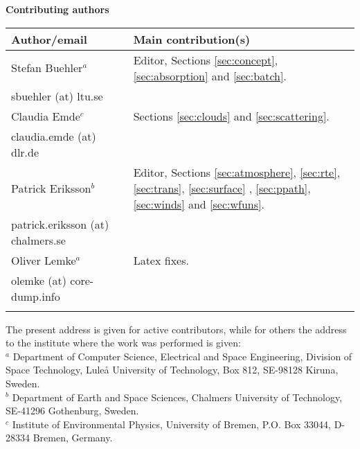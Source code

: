 \documentclass[11pt,twoside,a4paper,fleqn]{book}
\begin{document}
%
\newpage
\thispagestyle{plain}
%
\begin{center}
  {\Large \bf Contributing authors}
\end{center}
\vspace*{10mm}
\begin{tabular}{lp{10mm}l}
  \hline
  {\bf Author/email} & & {\bf Main contribution(s)} \\
  \hline
  Stefan Buehler$^a$ & & Editor, Sections \ref{sec:concept},
  \ref{sec:absorption} and \ref{sec:batch}.\\
  sbuehler (at) ltu.se & &        \\
 \hline
  Claudia Emde$^c$ & & Sections \ref{sec:clouds} and \ref{sec:scattering}.\\
  claudia.emde (at) dlr.de & & \\
  \hline
  Patrick Eriksson$^b$ &  & Editor, 
  Sections \ref{sec:atmosphere}, \ref{sec:rte}, \ref{sec:trans}, 
  \ref{sec:surface} , \ref{sec:ppath}, \ref{sec:winds} and \ref{sec:wfuns}.\\  
  patrick.eriksson (at) chalmers.se & & \\
  \hline
  Oliver Lemke$^a$ & & Latex fixes.\\
  olemke (at) core-dump.info & & \\
  \hline
 &&\\
\end{tabular}


\noindent
The present address is given for active contributors, while for others
the address to the institute where the work was performed is given:\\
$^a$ Department of Computer Science, Electrical and Space Engineering,
Division of Space Technology, Lule{\aa} University of Technology, Box
812, SE-98128 Kiruna, Sweden. \\
$^b$ Department of Earth and Space Sciences, Chalmers University of Technology,
SE-41296 Gothenburg, Sweden. \\
$^c$ Institute of Environmental Physics, University of Bremen, P.O. Box 33044, 
D-28334 Bremen, Germany. \\
\end{document}
